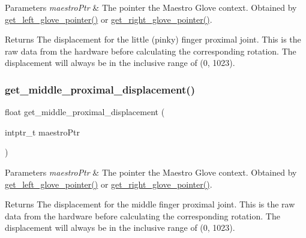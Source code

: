\begin{DoxyParams}{Parameters}
{\em maestro\+Ptr} & The pointer the Maestro Glove context. Obtained by \hyperlink{group__glove_management_ga63ce3c99d4a8b8db851b22af9185764e}{get\+\_\+left\+\_\+glove\+\_\+pointer()} or \hyperlink{group__glove_management_ga9b8fd9d91aeac3f8da50f7a7eba0c32b}{get\+\_\+right\+\_\+glove\+\_\+pointer()}. \\
\hline
\end{DoxyParams}
\begin{DoxyReturn}{Returns}
The displacement for the little (pinky) finger proximal joint. This is the raw data from the hardware before calculating the corresponding rotation. The displacement will always be in the inclusive range of (0, 1023). 
\end{DoxyReturn}
\mbox{\label{group__displacement_access_gabcd534e7e94fcbb7b35ce0406dd500bd}} 
\subsubsection{\texorpdfstring{get\+\_\+middle\+\_\+proximal\+\_\+displacement()}{get\_middle\_proximal\_displacement()}}
{\footnotesize\ttfamily float get\+\_\+middle\+\_\+proximal\+\_\+displacement (\begin{DoxyParamCaption}\item[{intptr\+\_\+t}]{maestro\+Ptr }\end{DoxyParamCaption})}


\begin{DoxyParams}{Parameters}
{\em maestro\+Ptr} & The pointer the Maestro Glove context. Obtained by \hyperlink{group__glove_management_ga63ce3c99d4a8b8db851b22af9185764e}{get\+\_\+left\+\_\+glove\+\_\+pointer()} or \hyperlink{group__glove_management_ga9b8fd9d91aeac3f8da50f7a7eba0c32b}{get\+\_\+right\+\_\+glove\+\_\+pointer()}. \\
\hline
\end{DoxyParams}
\begin{DoxyReturn}{Returns}
The displacement for the middle finger proximal joint. This is the raw data from the hardware before calculating the corresponding rotation. The displacement will always be in the inclusive range of (0, 1023). 
\end{DoxyReturn}
\mbox{\label{group__displacement_access_ga61acc449d1bb171722abef39f2c9d8bf}} 
